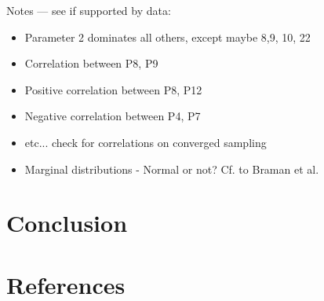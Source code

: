 \documentclass[preprint,3p,times,twocolumn]{elsarticle}
\begin{document}
 Notes --- see if supported by data:
 \begin{itemize}
    \item Parameter 2 dominates all others, except maybe 8,9, 10, 22
    \item Correlation between P8, P9
    \item Positive correlation between P8, P12
    \item Negative correlation between P4, P7  
    \item etc... check for correlations on converged sampling
    \item Marginal distributions - Normal or not? Cf. to Braman et al.
 \end{itemize}
%

\section{Conclusion}


\section{References}
    

\end{document}

